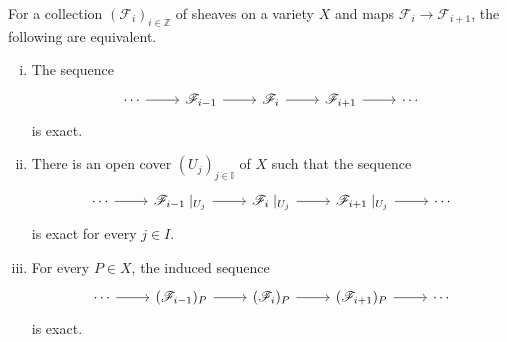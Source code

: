 \documentclass[12pt]{article}
\begin{document}
\begin{thm}\label{thm:ses_equivalence}
  For a collection $(\mathscr{F}_{i})_{i\in\mathbb{Z}}$ of sheaves on
  a variety $X$ and maps ${\mathscr{F}_{i}\to\mathscr{F}_{i+1}}$,
  the following are equivalent.
  \begin{enumerate}[(i)]
    \item The sequence
          \[
          \begin{tikzcd}
            \cdots \arrow{r} & \mathscr{F}_{i-1}\arrow{r}
            & \mathscr{F}_{i}\arrow{r} & \mathscr{F}_{i+1}\arrow{r} & \cdots
          \end{tikzcd}
          \]
          is exact.
    \item There is an open cover $(U_{j})_{j\in\mathbb{I}}$ of $X$ such that
          the sequence
          \[
          \begin{tikzcd}
            \cdots \arrow{r} & \mathscr{F}_{i-1}\mid_{U_{j}}\arrow{r}
            & \mathscr{F}_{i}\mid_{U_{j}}\arrow{r}
            & \mathscr{F}_{i+1}\mid_{U_{j}}\arrow{r} & \cdots
          \end{tikzcd}
          \]
          is exact for every $j\in I$.
    \item For every $P\in X$, the induced sequence
          \[
          \begin{tikzcd}
            \cdots \arrow{r} & (\mathscr{F}_{i-1})_{P}\arrow{r}
            & (\mathscr{F}_{i})_{P}\arrow{r}
            & (\mathscr{F}_{i+1})_{P}\arrow{r} & \cdots
          \end{tikzcd}
          \]
          is exact.
  \end{enumerate}
\end{thm}
\end{document}

